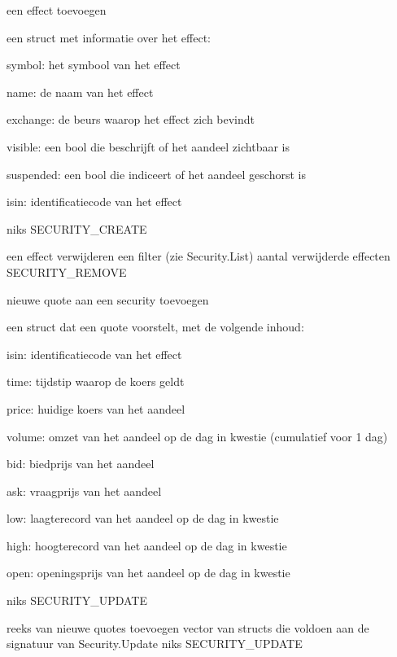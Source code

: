 	{ een effect toevoegen }
	{ een struct met informatie over het effect:
		\begin{itemize_compact}
		\item{symbol: het symbool van het effect}
		\item{name: de naam van het effect}
		\item{exchange: de beurs waarop het effect zich bevindt}
		\item{visible: een bool die beschrijft of het aandeel zichtbaar is}
		\item{suspended: een bool die indiceert of het aandeel geschorst is}
		\item{isin: identificatiecode van het effect}
		\end{itemize_compact} }
	{ niks }
	{ SECURITY\_CREATE }
	
	{ een effect verwijderen }
	{ een filter (zie Security.List) }
	{ aantal verwijderde effecten }
	{ SECURITY\_REMOVE }

	{ nieuwe quote aan een security toevoegen }
	{ een struct dat een quote voorstelt, met de volgende inhoud:
		\begin{itemize_compact}
		\item{isin: identificatiecode van het effect}
		\item{time: tijdstip waarop de koers geldt}
		\item{price: huidige koers van het aandeel}
		\item{volume: omzet van het aandeel op de dag in kwestie (cumulatief voor 1 dag)}
		\item{bid: biedprijs van het aandeel}
		\item{ask: vraagprijs van het aandeel}
		\item{low: laagterecord van het aandeel op de dag in kwestie}
		\item{high: hoogterecord van het aandeel op de dag in kwestie}
		\item{open: openingsprijs van het aandeel op de dag in kwestie}
		\end{itemize_compact} }
	{ niks }
	{ SECURITY\_UPDATE }

	{ reeks van nieuwe quotes toevoegen }
	{ vector van structs die voldoen aan de signatuur van Security.Update }
	{ niks }
	{ SECURITY\_UPDATE }

